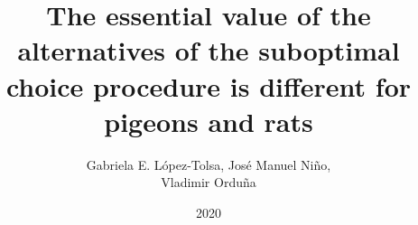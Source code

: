\documentclass[a4paper,12pt]{article}
\title{The essential value of the alternatives of the suboptimal choice procedure is different for pigeons and rats}
\author{Gabriela E. López-Tolsa, José Manuel Niño,\\Vladimir Orduña}
\date{2020}
\begin{document}
{\scshape\bfseries \maketitle}
\end{document}
